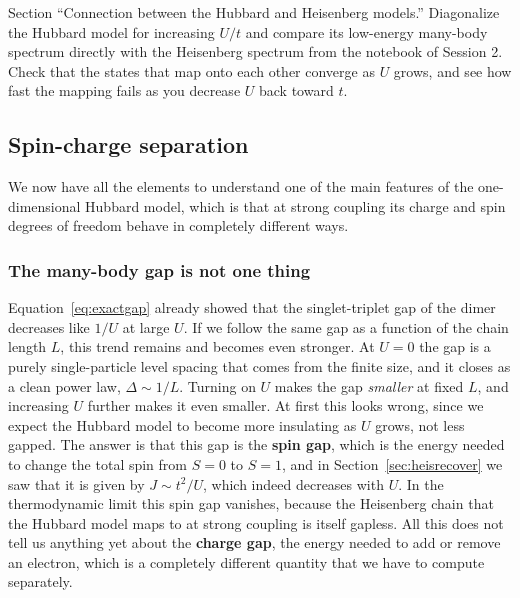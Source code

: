 \documentclass[lecture_notes.tex]{subfiles}
\begin{document}
\begin{notebook}
Section ``Connection between the Hubbard and Heisenberg models.'' Diagonalize the Hubbard model for
increasing $U/t$ and compare its low-energy many-body spectrum directly with the Heisenberg
spectrum from the notebook of Session 2. Check that the states that map onto each other converge as
$U$ grows, and see how fast the mapping fails as you decrease $U$ back toward $t$.
\end{notebook}

\subsection{Spin-charge separation}
\label{sec:spincharge}
We now have all the elements to understand one of the main features of the one-dimensional Hubbard
model, which is that at strong coupling its charge and spin degrees of freedom behave in completely
different ways.

\subsubsection{The many-body gap is not one thing}
Equation~\eqref{eq:exactgap} already showed that the singlet-triplet gap of the dimer decreases like
$1/U$ at large $U$. If we follow the same gap as a function of the chain length $L$, this trend
remains and becomes even stronger. At $U=0$ the gap is a purely single-particle level spacing that
comes from the finite size, and it closes as a clean power law, $\Delta \sim 1/L$. Turning on $U$
makes the gap \emph{smaller} at fixed $L$, and increasing $U$ further makes it even smaller. At
first this looks wrong, since we expect the Hubbard model to become more insulating as $U$ grows,
not less gapped. The answer is that this gap is the \textbf{spin gap}, which is the energy needed
to change the total spin from $S=0$ to $S=1$, and in Section~\ref{sec:heisrecover} we saw that it
is given by $J\sim t^2/U$, which indeed decreases with $U$. In the thermodynamic limit this spin
gap vanishes, because the Heisenberg chain that the Hubbard model maps to at strong coupling is
itself gapless. All this does not tell us anything yet about the \textbf{charge gap}, the energy
needed to add or remove an electron, which is a completely different quantity that we have to
compute separately.
\end{document}

